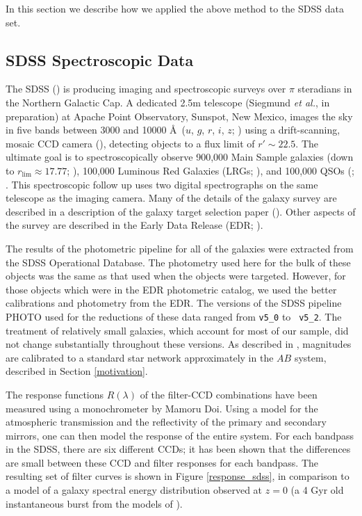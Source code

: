 \documentclass[10pt,preprint]{aastex}
\begin{document}
In this section we describe how we applied the above method to the
SDSS data set.

\subsection{SDSS Spectroscopic Data}

The SDSS (\citealt{york00a}) is producing imaging and spectroscopic
surveys over $\pi$ steradians in the Northern Galactic Cap. A
dedicated 2.5m telescope (Siegmund {\it et al.}, in preparation) at
Apache Point Observatory, Sunspot, New Mexico, images the sky in five
bands between 3000 and 10000 \AA\ ($u$, $g$, $r$, $i$, $z$;
\citealt{fukugita96a}) using a drift-scanning, mosaic CCD camera
(\citealt{gunn98a}), detecting objects to a flux limit of $r'\sim
22.5$. The ultimate goal is to spectroscopically observe 900,000 Main
Sample galaxies (down to $r_{\mathrm{lim}}\approx 17.77$;
\citealt{strauss02a}), 100,000 Luminous Red Galaxies (LRGs;
\citealt{eisenstein01a}), and 100,000 QSOs (\citealt{fan99a};
\citealt{richards02a}.  This spectroscopic follow up uses two digital
spectrographs on the same telescope as the imaging camera. Many of the
details of the galaxy survey are described in a description of the
galaxy target selection paper (\citealt{strauss02a}). Other aspects of
the survey are described in the Early Data Release (EDR;
\citealt{stoughton02a}).

The results of the photometric pipeline for all of the galaxies were
extracted from the SDSS Operational Database. The photometry used here
for the bulk of these objects was the same as that used when the
objects were targeted. However, for those objects which were in the
EDR photometric catalog, we used the better calibrations and
photometry from the EDR. The versions of the SDSS pipeline PHOTO used
for the reductions of these data ranged from {\tt v5\_0} to {\tt
v5\_2}. The treatment of relatively small galaxies, which account for
most of our sample, did not change substantially throughout these
versions. As described in \citet{smith02a}, magnitudes are calibrated to a
standard star network approximately in the $AB$ system, described in
Section \ref{motivation}.

The response functions $R(\lambda)$ of the filter-CCD combinations
have been measured using a monochrometer by Mamoru Doi.  Using a model
for the atmospheric transmission and the reflectivity of the primary
and secondary mirrors, one can then model the response of the entire
system. For each bandpass in the SDSS, there are six different CCDs;
it has been shown that the differences are small between these CCD and
filter responses for each bandpass.  The resulting set of filter
curves is shown in Figure \ref{response_sdss}, in comparison to a
model of a galaxy spectral energy distribution observed at $z=0$ (a 4
Gyr old instantaneous burst from the models of \citealt{bruzual93a}).
\end{document}
